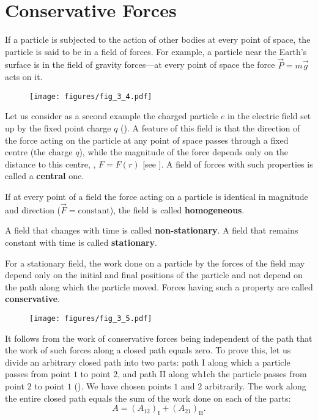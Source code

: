 \section{Conservative Forces}\label{sec:3_4}

If a particle is subjected to the action of other bodies at every point of space, the particle is said to be in a field of forces. For example, a particle near the Earth's surface is in the field of gravity forces---at every point of space the force $\vec{P}=m\vec{g}$ acts on it.

\begin{figure}[t]
	\begin{center}
		\texttt{[image: figures/fig\_3\_4.pdf]}
		\caption[]{}
		\label{fig:3_4}
	\end{center}
	\vspace{-0.7cm}
\end{figure}

Let us consider as a second example the charged particle $e$ in the electric field set up by the fixed point charge $q$ (). A feature of this field is that the direction of the force acting on the particle at any point of space passes through a fixed centre (the charge $q$), while the magnitude of the force depends only on the distance to this centre, \ie, $F=F(r)$ [see ]. A field of forces with such properties is called a \textbf{central} one.

If at every point of a field the force acting on a particle is identical in magnitude and direction ($\vec{F}=\text{constant}$), the field is called \textbf{homogeneous}.

A field that changes with time is called \textbf{non-stationary}. A field that remains constant with time is called \textbf{stationary}.

For a stationary field, the work done on a particle by the forces of the field may depend only on the initial and final positions of the particle and not depend on the path along which the particle moved. Forces having such a property are called \textbf{conservative}.

\begin{figure}[t]
	\begin{center}
		\texttt{[image: figures/fig\_3\_5.pdf]}
		\caption[]{}
		\label{fig:3_5}
	\end{center}
\vspace{-0.7cm}
\end{figure}

It follows from the work of conservative forces being independent of the path that the work of such forces along a closed path equals zero. To prove this, let us divide an arbitrary closed path into two parts: path I along which a particle passes from point $1$ to point $2$, and path II along wh1ch the particle passes from point $2$ to point $1$ (). We have chosen points $1$ and $2$ arbitrarily. The work along the entire closed path equals the sum of the work done on each of the parts:
\begin{equation}\label{eq:3_22}
A = (A_{12})_{\text{I}} + (A_{21})_{\text{II}}.
\end{equation}

